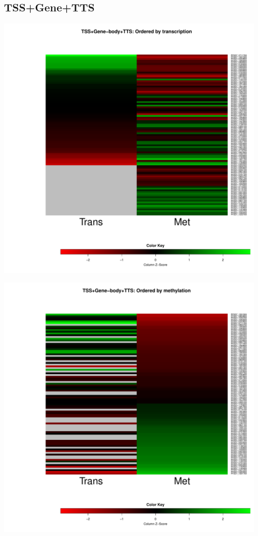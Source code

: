 \documentclass{article}\usepackage[]{graphicx}\usepackage[]{color}
\newenvironment{knitrout}{}{} %
\begin{document}
\subsection{TSS+Gene+TTS}
\begin{knitrout}
\color{fgcolor}

{\centering \includegraphics[width=.9\linewidth]{figure/minimal-heatmap_all-1} 

}



\end{knitrout}
\clearpage
\begin{knitrout}
\color{fgcolor}

{\centering \includegraphics[width=.9\linewidth]{figure/minimal-heatmap_all_metord-1} 

}



\end{knitrout}
\end{document}
